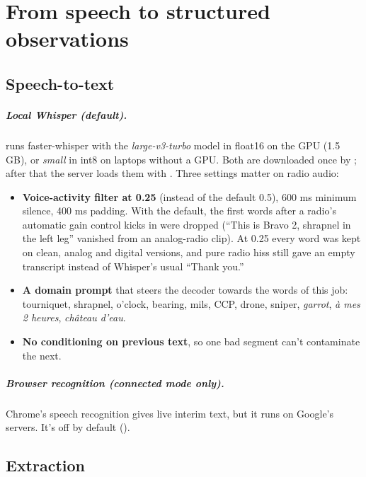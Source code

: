 \chapter{From speech to structured observations}\label{ch:language}

\section{Speech-to-text}

\paragraph{Local Whisper (default).}  runs faster-whisper with the
\emph{large-v3-turbo} model in float16 on the GPU (1.5 GB), or \emph{small} in int8 on laptops
without a GPU. Both are downloaded once by ; after that the server
loads them with . Three settings matter on radio audio:
\begin{itemize}
  \item \textbf{Voice-activity filter at 0.25} (instead of the default 0.5), 600 ms minimum silence,
        400 ms padding. With the default, the first words after a radio's automatic gain control kicks in
        were dropped (``This is Bravo 2, shrapnel in the left leg'' vanished from an analog-radio clip).
        At 0.25 every word was kept on clean, analog and digital versions, and pure radio hiss still
        gave an empty transcript instead of Whisper's usual ``Thank you.''
  \item \textbf{A domain prompt} that steers the decoder towards the words of this job: tourniquet,
        shrapnel, o'clock, bearing, mils, CCP, drone, sniper, \emph{garrot}, \emph{à mes 2 heures},
        \emph{château d'eau}.
  \item \textbf{No conditioning on previous text}, so one bad segment can't contaminate the next.
\end{itemize}

\paragraph{Browser recognition (connected mode only).} Chrome's speech recognition gives live interim
text, but it runs on Google's servers. It's off by default ().

\section{Extraction}


